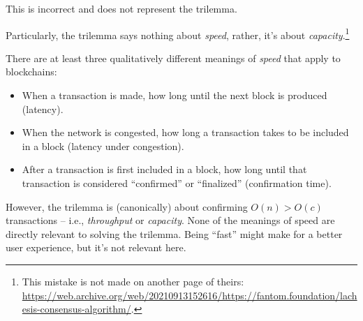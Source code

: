This is incorrect and does not represent the trilemma.

Particularly, the trilemma says nothing about \emph{speed}, rather, it's about \emph{capacity}.\footnote{
    This mistake is not made on another page of theirs: \url{https://web.archive.org/web/20210913152616/https://fantom.foundation/lachesis-consensus-algorithm/}.
}

There are at least three qualitatively different meanings of \emph{speed} that apply to blockchains:

\begin{itemize}
    \item When a transaction is made, how long until the next block is produced (latency).
    \item When the network is congested, how long a transaction takes to be included in a block (latency under congestion).
    \item After a transaction is first included in a block, how long until that transaction is considered ``confirmed'' or ``finalized'' (confirmation time).
\end{itemize}

However, the trilemma is (canonically) about confirming $O(n) > O(c)$ transactions -- i.e., \emph{throughput} or \emph{capacity}.
None of the meanings of speed are directly relevant to solving the trilemma.
Being ``fast'' might make for a better user experience, but it's not relevant here.

